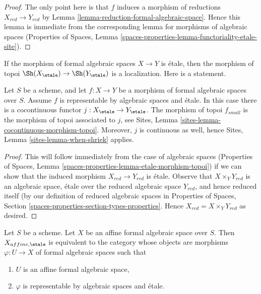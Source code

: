 \begin{proof}
The only point here is that $f$ induces a morphism of reductions
$X_{red} \to Y_{red}$ by Lemma \ref{lemma-reduction-formal-algebraic-space}.
Hence this lemma is immediate from the corresponding lemma for
morphisms of algebraic spaces (Properties of Spaces,
Lemma \ref{spaces-properties-lemma-functoriality-etale-site}).
\end{proof}

\noindent
If the morphism of formal algebraic spaces $X \to Y$ is \'etale,
then the morphism of topoi $\Sh(X_\etale) \to \Sh(Y_\etale)$
is a localization. Here is a statement.

\begin{lemma}
\label{lemma-etale-morphism-topoi}
Let $S$ be a scheme, and let $f : X \to Y$ be a morphism of
formal algebraic spaces over $S$. Assume $f$ is representable
by algebraic spaces and \'etale. In this case there is a
cocontinuous functor $j : X_\etale \to Y_\etale$.
The morphism of topoi $f_{small}$ is the
morphism of topoi associated to $j$, see
Sites, Lemma \ref{sites-lemma-cocontinuous-morphism-topoi}.
Moreover, $j$ is continuous as well, hence
Sites, Lemma \ref{sites-lemma-when-shriek} applies.
\end{lemma}

\begin{proof}
This will follow immediately from the case of algebraic spaces
(Properties of Spaces, Lemma
\ref{spaces-properties-lemma-etale-morphism-topoi})
if we can show that the induced morphism $X_{red} \to Y_{red}$
is \'etale. Observe that $X \times_Y Y_{red}$ is an
algebraic space, \'etale over the reduced algebraic space $Y_{red}$,
and hence reduced itself (by our definition of reduced algebraic
spaces in Properties of Spaces, Section
\ref{spaces-properties-section-types-properties}.
Hence $X_{red} = X \times_Y Y_{red}$ as desired.
\end{proof}

\begin{lemma}
\label{lemma-affine-identify-affine-etale}
Let $S$ be a scheme. Let $X$ be an affine formal algebraic space over $S$.
Then $X_{affine, \etale}$ is equivalent to the category whose objects
are morphisms $\varphi : U \to X$ of formal algebraic spaces such that
\begin{enumerate}
\item $U$ is an affine formal algebraic space,
\item $\varphi$ is representable by algebraic spaces and \'etale.
\end{enumerate}
\end{lemma}

